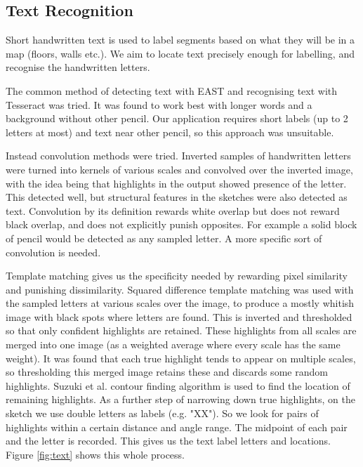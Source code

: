 \documentclass[11pt]{IEEEtran}
\begin{document}
\subsection{Text Recognition}
Short handwritten text is used to label segments based on what they will be in a map (floors, walls etc.). We aim to locate text precisely enough for labelling, and recognise the handwritten letters. 

The common method of detecting text with EAST and recognising text with Tesseract was tried. It was found to work best with longer words and a background without other pencil. Our application requires short labels (up to 2 letters at most) and text near other pencil, so this approach was unsuitable.

Instead convolution methods were tried. Inverted samples of handwritten letters were turned into kernels of various scales and convolved over the inverted image, with the idea being that highlights in the output showed presence of the letter. This detected well, but structural features in the sketches were also detected as text. Convolution by its definition rewards white overlap but does not reward black overlap, and does not explicitly punish opposites. For example a solid block of pencil would be detected as any sampled letter. A more specific sort of convolution is needed.

Template matching gives us the specificity needed by rewarding pixel similarity and punishing dissimilarity. Squared difference template matching was used with the sampled letters at various scales over the image, to produce a mostly whitish image with black spots where letters are found. This is inverted and thresholded so that only confident highlights are retained. These highlights from all scales are merged into one image (as a weighted average where every scale has the same weight). It was found that each true highlight tends to appear on multiple scales, so thresholding this merged image retains these and discards some random highlights. Suzuki et al. \cite{suzuki1985topological} contour finding algorithm is used to find the location of remaining highlights. As a further step of narrowing down true highlights, on the sketch we use double letters as labels (e.g. "XX"). So we look for pairs of highlights within a certain distance and angle range. The midpoint of each pair and the letter is recorded. This gives us the text label letters and locations. Figure \ref{fig:text} shows this whole process.
\end{document}
